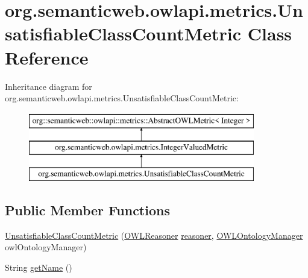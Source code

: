 \hypertarget{classorg_1_1semanticweb_1_1owlapi_1_1metrics_1_1_unsatisfiable_class_count_metric}{\section{org.\-semanticweb.\-owlapi.\-metrics.\-Unsatisfiable\-Class\-Count\-Metric Class Reference}
\label{classorg_1_1semanticweb_1_1owlapi_1_1metrics_1_1_unsatisfiable_class_count_metric}
}
Inheritance diagram for org.\-semanticweb.\-owlapi.\-metrics.\-Unsatisfiable\-Class\-Count\-Metric\-:\begin{figure}[H]
\begin{center}
\leavevmode
\includegraphics[height=3.000000cm]{classorg_1_1semanticweb_1_1owlapi_1_1metrics_1_1_unsatisfiable_class_count_metric}
\end{center}
\end{figure}
\subsection*{Public Member Functions}
\begin{DoxyCompactItemize}
\item 
\hyperlink{classorg_1_1semanticweb_1_1owlapi_1_1metrics_1_1_unsatisfiable_class_count_metric_a18050c4888a96842c906fcbd79188d29}{Unsatisfiable\-Class\-Count\-Metric} (\hyperlink{interfaceorg_1_1semanticweb_1_1owlapi_1_1reasoner_1_1_o_w_l_reasoner}{O\-W\-L\-Reasoner} \hyperlink{classorg_1_1semanticweb_1_1owlapi_1_1metrics_1_1_unsatisfiable_class_count_metric_a22b41c912834349275f2b2b66ee4b189}{reasoner}, \hyperlink{interfaceorg_1_1semanticweb_1_1owlapi_1_1model_1_1_o_w_l_ontology_manager}{O\-W\-L\-Ontology\-Manager} owl\-Ontology\-Manager)
\item 
String \hyperlink{classorg_1_1semanticweb_1_1owlapi_1_1metrics_1_1_unsatisfiable_class_count_metric_ab66821deb96bade93b3b375b78962f4d}{get\-Name} ()
\end{DoxyCompactItemize}
